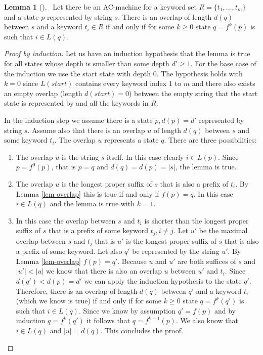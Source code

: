 \documentclass[english,twoside,censored,csm,algorithms-track-2020]{HYthesisML}
\theoremstyle{plain}
\theoremstyle{definition}
\newtheorem{lemma}[theorem]{Lemma}
\begin{document}


\begin{lemma}[] ~\label{lem-overlap-length}
  Let there be an AC-machine for a keyword set $R=\{t_1,...,t_m\}$ and a state $p$ represented
  by string $s$.
  There is an overlap of length $d(q)$ between $s$ and a keyword $t_i\in R$ if and only if
  for some $k \geq 0$ state $q=f^k(p)$ is such that $i\in L(q)$.
\end{lemma}
\begin{proof}[Proof by induction]
  Let us have an induction hypothesis that the lemma is true for all states whose depth is
  smaller than some depth $d'\geq 1$. For the base case of the induction we use the start state
  with depth 0. The hypothesis holds
  with $k=0$ since $L(start)$ contains every keyword index $1$ to $m$ and there also exists an empty
  overlap (length $d(start)=0$) between the empty string that the start state is represented by and all
  the keywords in $R$.

  In the induction step we assume there is a state $p, d(p) = d'$ represented by string $s$.
  Assume also that there is an overlap $u$ of length $d(q)$ between $s$ and some keyword $t_i$. The
  overlap $u$ represents a state $q$.
  There are three possibilities:
  \begin{enumerate}
  \item The overlap $u$ is the string $s$ itself. In this case clearly $i\in L(p)$. Since
    $p=f^0(p)$, that is $p=q$ and $d(q) = d(p) = |s|$, the lemma is true. 
  \item The overlap $u$ is the longest proper suffix of $s$ that is also a prefix of $t_i$.
    By Lemma \ref{lem-overlap} this is true if and only if $f(p) = q$. In this case
    $i\in L(q)$ and the lemma is true with $k=1$.
  \item In this case the overlap between $s$ and $t_i$ is shorter than the longest proper
    suffix of $s$ that is a prefix of some keyword $t_j, i\neq j$. Let $u'$ be the maximal
    overlap between $s$ and $t_j$ that is $u'$ is the longest proper suffix of $s$ that is also
    a prefix of some keyword. Let also $q'$ be represented by the string $u'$. By Lemma
    \ref{lem-overlap} $f(p) = q'$. Because $u$ and $u'$ are both suffices of $s$ and $|u'|<|u|$ we
    know that there is also an overlap $u$ between $u'$ and $t_i$. Since $d(q') < d(p) = d'$ we can
    apply the induction hypothesis to the state $q'$. Therefore, there is an overlap of length
    $d(q)$ between $q'$ and a keyword $t_i$ (which we know is true) if and only if for some
    $k \geq 0$ state $q=f^k(q')$ is such that $i\in L(q)$. Since we know by assumption $q'=f(p)$ and
    by induction $q=f^k(q')$ it follows that $q=f^{k+1}(p)$. We also know that $i\in L(q)$ and
    $|u|=d(q)$. This concludes the proof.
    
  \end{enumerate}
\end{proof}
\end{document}
